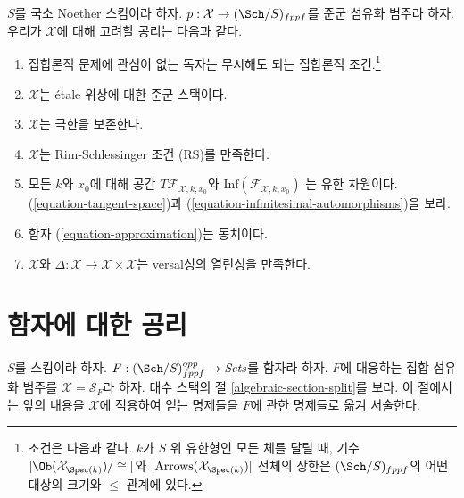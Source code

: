 \noindent
$S$를 국소 Noether 스킴이라 하자.
$p : \mathcal{X} \to (\Sch/S)_{fppf}$를 준군 섬유화 범주라 하자.
우리가 $\mathcal{X}$에 대해 고려할 공리는 다음과 같다.
\begin{enumerate}
\item[{[-1]}] 집합론적 문제에 관심이 없는 독자는 무시해도 되는
집합론적 조건.\footnote{조건은 다음과 같다. $k$가 $S$ 위 유한형인
모든 체를 달릴 때, 기수 $|\Ob(\mathcal{X}_{\Spec(k)})/\cong|$와
$|\text{Arrows}(\mathcal{X}_{\Spec(k)})|$ 전체의 상한은
$(\Sch/S)_{fppf}$의 어떤 대상의 크기와 $\leq$ 관계에 있다.}
\item[{[0]}] $\mathcal{X}$는 \'etale 위상에 대한 준군 스택이다.
\item[{[1]}] $\mathcal{X}$는 극한을 보존한다.
\item[{[2]}] $\mathcal{X}$는 Rim-Schlessinger 조건 (RS)를 만족한다.
\item[{[3]}] 모든 $k$와 $x_0$에 대해 공간 $T\mathcal{F}_{\mathcal{X}, k, x_0}$와
$\text{Inf}(\mathcal{F}_{\mathcal{X}, k, x_0})$
는 유한 차원이다.
(\ref{equation-tangent-space})과
(\ref{equation-infinitesimal-automorphisms})을 보라.
\item[{[4]}] 함자 (\ref{equation-approximation})는 동치이다.
\item[{[5]}] $\mathcal{X}$와
$\Delta : \mathcal{X} \to \mathcal{X} \times \mathcal{X}$는
versal성의 열린성을 만족한다.
\end{enumerate}










\section{함자에 대한 공리}
\label{section-axioms-functors}

\noindent
$S$를 스킴이라 하자. $F : (\Sch/S)_{fppf}^{opp} \to \textit{Sets}$를
함자라 하자.
$F$에 대응하는 집합 섬유화 범주를 $\mathcal{X} = \mathcal{S}_F$라 하자.
대수 스택의 절 \ref{algebraic-section-split}를 보라.
이 절에서는 앞의 내용을 $\mathcal{X}$에 적용하여 얻는 명제들을
$F$에 관한 명제들로 옮겨 서술한다.

